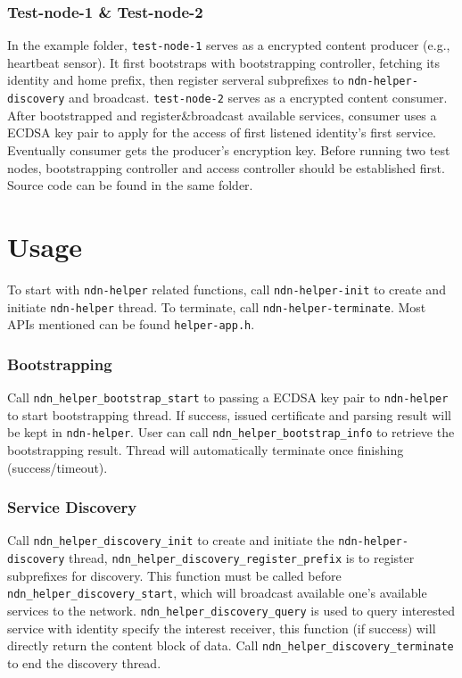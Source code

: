 \documentclass[a4paper, 11pt]{article}
\begin{document}
        \subsubsection*{Test-node-1 \& Test-node-2}
        In the example folder, \texttt{test-node-1} serves as a encrypted content producer (e.g., heartbeat sensor). It first bootstraps with bootstrapping controller, fetching its identity and home prefix, then register serveral subprefixes to \texttt{ndn-helper-discovery} and broadcast. 
        \texttt{test-node-2} serves as a encrypted content consumer. After bootstrapped and register\&broadcast available services, consumer uses a ECDSA key pair to apply for the access of first listened identity's first service. Eventually consumer gets the producer's encryption key. Before running two test nodes, bootstrapping controller and access controller 
        should be established first. Source code can be found in the same folder.

        \section*{Usage}
        To start with \texttt{ndn-helper} related functions, call \texttt{ndn-helper-init} to create and initiate \texttt{ndn-helper} thread. To terminate, call \texttt{ndn-helper-terminate}. Most APIs mentioned can be found \texttt{helper-app.h}.
        
        \subsubsection*{Bootstrapping}
        Call \texttt{ndn\_helper\_bootstrap\_start} to passing a ECDSA key pair to \texttt{ndn-helper} to start bootstrapping thread. If success, issued certificate and parsing result will be kept in \texttt{ndn-helper}. User can call \texttt{ndn\_helper\_bootstrap\_info} to retrieve the bootstrapping result. Thread will automatically terminate once finishing (success/timeout).
    
        \subsubsection*{Service Discovery}
        Call \texttt{ndn\_helper\_discovery\_init} to create and initiate the \texttt{ndn-helper-discovery} thread, \texttt{ndn\_helper\_discovery\_register\_prefix} is to register subprefixes for discovery. This function must be called before \texttt{ndn\_helper\_discovery\_start}, which will broadcast available one's available services to the network. \texttt{ndn\_helper\_discovery\_query} is used to query interested service with identity specify the interest receiver, this function (if success) will directly return the content block of data. Call \texttt{ndn\_helper\_discovery\_terminate}
        to end the discovery thread.
        
\end{document}

